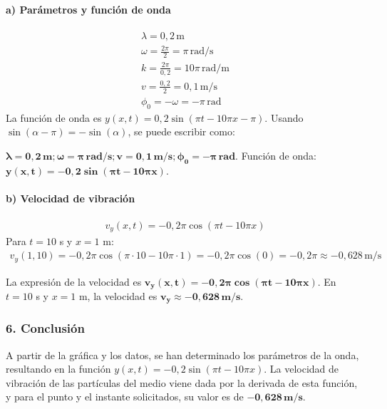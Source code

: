\paragraph*{a) Parámetros y función de onda}
\begin{gather}
    \lambda = 0,2 \, \text{m} \\
    \omega = \frac{2\pi}{2} = \pi \, \text{rad/s} \\
    k = \frac{2\pi}{0,2} = 10\pi \, \text{rad/m} \\
    v = \frac{0,2}{2} = 0,1 \, \text{m/s} \\
    \phi_0 = -\omega = -\pi \, \text{rad}
\end{gather}
La función de onda es $y(x,t) = 0,2 \sin(\pi t - 10\pi x - \pi)$. Usando $\sin(\alpha-\pi)=-\sin(\alpha)$, se puede escribir como:
\begin{cajaresultado}
    $\boldsymbol{\lambda=0,2\,m; \omega=\pi\,rad/s; v=0,1\,m/s; \phi_0=-\pi\,rad}$.
    Función de onda: $\boldsymbol{y(x,t) = -0,2 \sin(\pi t - 10\pi x)}$.
\end{cajaresultado}

\paragraph*{b) Velocidad de vibración}
\begin{gather}
    v_y(x,t) = -0,2\pi \cos(\pi t - 10\pi x)
\end{gather}
Para $t=10$ s y $x=1$ m:
\begin{gather}
    v_y(1,10) = -0,2\pi \cos(\pi \cdot 10 - 10\pi \cdot 1) = -0,2\pi \cos(0) = -0,2\pi \approx -0,628 \, \text{m/s}
\end{gather}
\begin{cajaresultado}
    La expresión de la velocidad es $\boldsymbol{v_y(x,t) = -0,2\pi \cos(\pi t - 10\pi x)}$.
    En $t=10$ s y $x=1$ m, la velocidad es $\boldsymbol{v_y \approx -0,628 \, m/s}$.
\end{cajaresultado}

\subsubsection*{6. Conclusión}
\begin{cajaconclusion}
    A partir de la gráfica y los datos, se han determinado los parámetros de la onda, resultando en la función $y(x,t) = -0,2 \sin(\pi t - 10\pi x)$. La velocidad de vibración de las partículas del medio viene dada por la derivada de esta función, y para el punto y el instante solicitados, su valor es de $\mathbf{-0,628 \, m/s}$.
\end{cajaconclusion}

